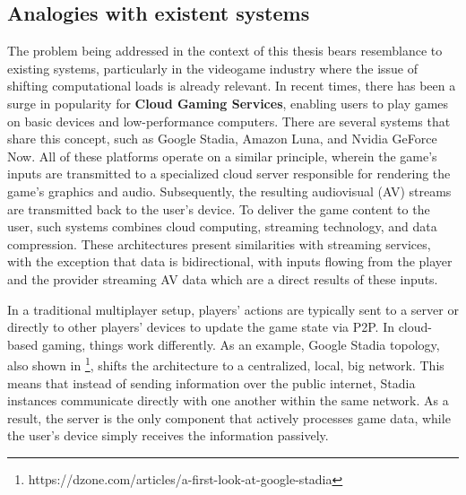 \subsection{Analogies with existent systems}
\label{ssec:analogies-with-existent-systems}
The problem being addressed in the context of this thesis bears resemblance to existing systems, particularly in the videogame industry where the issue of shifting computational loads is already relevant. In recent times, there has been a surge in popularity for \textbf{Cloud Gaming Services}, enabling users to play games on basic devices and low-performance computers. There are several systems that share this concept, such as Google Stadia, Amazon Luna, and Nvidia GeForce Now. All of these platforms operate on a similar principle, wherein the game's inputs are transmitted to a specialized cloud server responsible for rendering the game's graphics and audio. Subsequently, the resulting audiovisual (AV) streams are transmitted back to the user's device. To deliver the game content to the user, such systems combines cloud computing, streaming technology, and data compression. These architectures present similarities with streaming services, with the exception that data is bidirectional, with inputs flowing from the player and the provider streaming AV data which are a direct results of these inputs.\newline

In a traditional multiplayer setup, players' actions are typically sent to a server or directly to other players' devices to update the game state via P2P. In cloud-based gaming, things work differently. As an example, Google Stadia topology, also shown in  \footnote{https://dzone.com/articles/a-first-look-at-google-stadia}, shifts the architecture to a centralized, local, big network. This means that instead of sending information over the public internet, Stadia instances communicate directly with one another within the same network. As a result, the server is the only component that actively processes game data, while the user's device simply receives the information passively.\newline



